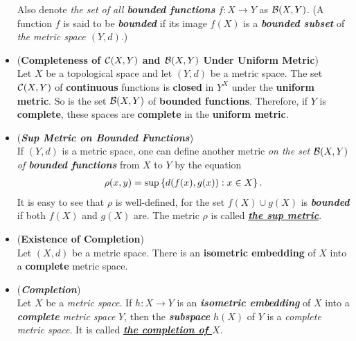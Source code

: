 \documentclass[11pt]{article}
\begin{document}
\begin{itemize}
\begin{definition}
Also denote \emph{the set  of all \textbf{bounded functions}} $f: X \rightarrow Y$ as ${\mathcal B}(X, Y)$. (A function $f$ is said to be \emph{\textbf{bounded}} if its image $f(X)$ is a \emph{\textbf{bounded subset}} of \emph{the metric space $(Y, d)$}.) 
\end{definition}

\item \begin{proposition}  (\textbf{Completeness of ${\mathcal C}(X, Y)$ and   ${\mathcal B}(X, Y)$  Under Uniform Metric}) \citep{munkres2000topology} \\
Let $X$ be a topological space and let $(Y, d)$ be a metric space. The set ${\mathcal C}(X, Y)$ of \textbf{continuous} functions is \textbf{closed} in $Y^X$ under the \textbf{uniform metric}. So is the set ${\mathcal B}(X, Y)$ of \textbf{bounded functions}. Therefore, if $Y$ is \textbf{complete}, these spaces are \textbf{complete} in the \textbf{uniform metric}.
\end{proposition}

\item \begin{definition} (\emph{\textbf{Sup Metric on Bounded Functions}})\\
If $(Y, d)$ is a metric space, one can define another metric \emph{on the set ${\mathcal B}(X, Y)$ of \textbf{bounded functions}} from $X$ to $Y$ by the equation
\begin{align*}
\rho(x, y) = \sup\left\{d(f(x), g(x)): x \in X\right\}.
\end{align*}
It is easy to see that $\rho$ is well-defined, for the set $f(X) \cup g(X)$ is \emph{\textbf{bounded}} if both $f(X)$ and $g(X)$ are. The metric $\rho$ is called \underline{\emph{\textbf{the sup metric}}}.
\end{definition}

\item \begin{theorem} (\textbf{Existence of Completion}) \citep{munkres2000topology}\\
Let $(X, d)$ be a metric space. There is an \textbf{isometric embedding} of $X$ into a \textbf{complete} metric space.
\end{theorem}

\item \begin{definition} (\emph{\textbf{Completion}})\\
Let $X$ be a \emph{metric space}. If $h : X \rightarrow Y$ is an \textbf{\emph{isometric embedding}} of $X$ into a \emph{\textbf{complete} metric space} $Y$, then the \emph{\textbf{subspace}} $h(X)$ of $Y$ is a \emph{complete metric space}. It is called \underline{\emph{\textbf{the completion of $X$}}}.
\end{definition}


\end{itemize}
\end{document}
